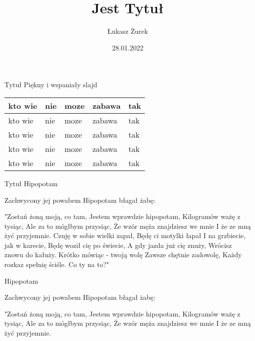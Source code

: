 \documentclass{beamer}
\title{Jest Tytuł}
\author{Łukasz Żurek}
\date{28.01.2022}
\begin{document}
 \begin{frame}
\titlepage
\end{frame}
\begin{frame}{Tytuł}
Piękny i wspaniały slajd
\begin{tabular}{ |l |l |l |l |l|} 
\hline
	

  kto wie & nie & moze & zabawa & tak  \\ \hline
  kto wie & nie & moze & zabawa & tak   \\ \hline
  kto wie & nie & moze & zabawa  & tak  \\ \hline
  kto wie &nie & moze & zabawa & tak  \\ \hline
    kto wie & nie & moze & zabawa & tak   \\ \hline
\end{tabular}

\end{frame}
\begin{frame}{Tytuł}
Hipopotam

Zachwycony jej powabem
Hipopotam błagał żabę:

"Zostań żoną moją, co tam,
Jestem wprawdzie hipopotam,
Kilogramów ważę z tysiąc,
Ale za to mógłbym przysiąc,
Że wzór męża znajdziesz we mnie
I że ze mną żyć przyjemnie.
Czuję w sobie wielki zapał,
Będę ci motylki łapał
I na grzbiecie, jak w karecie,
Będę woził cię po świecie,
A gdy jazda już cię znuży,
Wrócisz znowu do kałuży.
Krótko mówiąc - twoją wolę
Zawsze chętnie zadowolę,
Każdy rozkaz spełnię ściśle.
Co ty na to?"

\begin{figure}
   
    
   
    \label{fig:Stąd się właśnie pewność bierze,
Że nie jestem ptak ni zwierzę,}
\end{figure}

Hipopotam

Zachwycony jej powabem
Hipopotam błagał żabę:

"Zostań żoną moją, co tam,
Jestem wprawdzie hipopotam,
Kilogramów ważę z tysiąc,
Ale za to mógłbym przysiąc,
Że wzór męża znajdziesz we mnie
I że ze mną żyć przyjemnie.
\end{frame}
\end{document}
